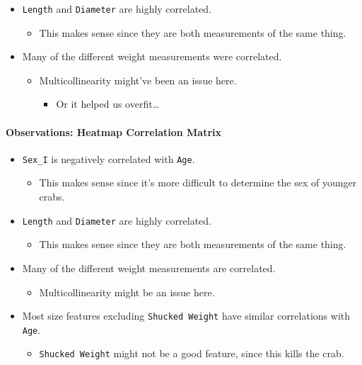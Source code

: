 \documentclass[11pt]{article}
\providecommand{\tightlist}{%
      \setlength{\itemsep}{0pt}\setlength{\parskip}{0pt}}
\begin{document}
\begin{itemize}
\tightlist
\item
  \texttt{Length} and \texttt{Diameter} are highly correlated.

  \begin{itemize}
  \tightlist
  \item
    This makes sense since they are both measurements of the same thing.
  \end{itemize}
\item
  Many of the different weight measurements were correlated.

  \begin{itemize}
  \tightlist
  \item
    Multicollinearity might've been an issue here.

    \begin{itemize}
    \tightlist
    \item
      Or it helped us overfit\ldots{}
    \end{itemize}
  \end{itemize}
\end{itemize}

    \paragraph{Observations: Heatmap Correlation
Matrix}\label{observations-heatmap-correlation-matrix}

\begin{itemize}
\tightlist
\item
  \texttt{Sex\_I} is negatively correlated with \texttt{Age}.

  \begin{itemize}
  \tightlist
  \item
    This makes sense since it's more difficult to determine the sex of
    younger crabs.
  \end{itemize}
\item
  \texttt{Length} and \texttt{Diameter} are highly correlated.

  \begin{itemize}
  \tightlist
  \item
    This makes sense since they are both measurements of the same thing.
  \end{itemize}
\item
  Many of the different weight measurements are correlated.

  \begin{itemize}
  \tightlist
  \item
    Multicollinearity might be an issue here.
  \end{itemize}
\item
  Most size features excluding \texttt{Shucked\ Weight} have similar
  correlations with \texttt{Age}.

  \begin{itemize}
  \tightlist
  \item
    \texttt{Shucked\ Weight} might not be a good feature, since this
    kills the crab.
  \end{itemize}
\end{itemize}
\end{document}

